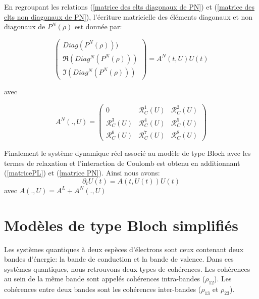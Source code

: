 \documentclass[12pt,a4paper,openany,oneside]{book}
\begin{document}
{{{{{{En regroupant les relations (\ref{matrice des elts diagonaux de PN}) et (\ref{matrice des elts non diagonaux de PN}), l'écriture matricielle des éléments diagonaux et non diagonaux de $ P^{N}(\rho)$ est donnée par:

\begin{equation}\label{matrice PN}
\begin{pmatrix} Diag(P^{N}(\rho)))\\ \Re(Diag^{N}(P^{N}(\rho))) \\ \Im(Diag^{N}(P^{N}(\rho)))\end{pmatrix}= A^{N}(t,U)U (t)
\end{equation}

avec

\begin{equation}\label{matrice AN}
A^{N}(.,U)=
\begin{pmatrix}
0 & \mathcal{R}^{1}_{C}(U) & \mathcal{R}^{2}_{C}(U)\\
\mathcal{R}^{3}_{C}(U) & \mathcal{R}^{4}_{C}(U) & \mathcal{R}^{5}_{C}(U) \\
\mathcal{R}^{6}_{C}(U) & \mathcal{R}^{7}_{C}(U)&\mathcal{R}^{8}_{C}(U)
\end{pmatrix}
\end{equation}


Finalement le système dynamique réel associé au modèle de type Bloch avec les termes de relaxation et l'interaction de Coulomb est obtenu en additionnant (\ref{matricePL}) et (\ref{matrice PN}).
Ainsi nous avons:
\begin{equation}\label{equation du systeme dynamique reel non lineaire}
\partial_{t}U(t) = A(t,U(t))U(t) 
\end{equation}
avec $ A(.,U)= A^{L}+ A^{N}(.,U)$

\section{Modèles de type Bloch simplifiés}
Les systèmes quantiques à deux espèces d’électrons sont ceux contenant deux bandes d'énergie:
la bande de conduction et la bande de valence. Dans ces systèmes quantiques, nous retrouvons deux types de cohérences. Les cohérences au sein de la même bande sont appelés cohérences intra-bandes ($\rho_{12}$). Les cohérences entre deux bandes sont les cohérences inter-bandes ($\rho_{13}$ et $\rho_{23}$).


}}}}}}
\end{document}
